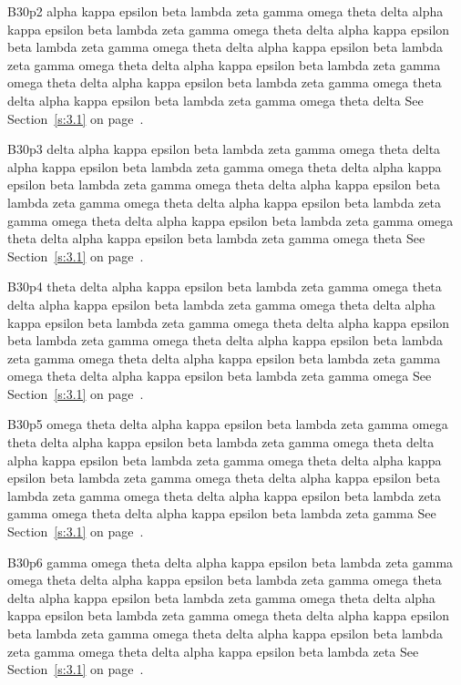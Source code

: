 B30p2 alpha kappa epsilon beta lambda zeta gamma omega theta delta alpha kappa epsilon beta lambda zeta gamma omega theta delta alpha kappa epsilon beta lambda zeta gamma omega theta delta alpha kappa epsilon beta lambda zeta gamma omega theta delta alpha kappa epsilon beta lambda zeta gamma omega theta delta alpha kappa epsilon beta lambda zeta gamma omega theta delta alpha kappa epsilon beta lambda zeta gamma omega theta delta See Section~\ref{s:3.1} on page~\pageref{s:3.1}.

B30p3 delta alpha kappa epsilon beta lambda zeta gamma omega theta delta alpha kappa epsilon beta lambda zeta gamma omega theta delta alpha kappa epsilon beta lambda zeta gamma omega theta delta alpha kappa epsilon beta lambda zeta gamma omega theta delta alpha kappa epsilon beta lambda zeta gamma omega theta delta alpha kappa epsilon beta lambda zeta gamma omega theta delta alpha kappa epsilon beta lambda zeta gamma omega theta See Section~\ref{s:3.1} on page~\pageref{s:3.1}.

B30p4 theta delta alpha kappa epsilon beta lambda zeta gamma omega theta delta alpha kappa epsilon beta lambda zeta gamma omega theta delta alpha kappa epsilon beta lambda zeta gamma omega theta delta alpha kappa epsilon beta lambda zeta gamma omega theta delta alpha kappa epsilon beta lambda zeta gamma omega theta delta alpha kappa epsilon beta lambda zeta gamma omega theta delta alpha kappa epsilon beta lambda zeta gamma omega See Section~\ref{s:3.1} on page~\pageref{s:3.1}.

B30p5 omega theta delta alpha kappa epsilon beta lambda zeta gamma omega theta delta alpha kappa epsilon beta lambda zeta gamma omega theta delta alpha kappa epsilon beta lambda zeta gamma omega theta delta alpha kappa epsilon beta lambda zeta gamma omega theta delta alpha kappa epsilon beta lambda zeta gamma omega theta delta alpha kappa epsilon beta lambda zeta gamma omega theta delta alpha kappa epsilon beta lambda zeta gamma See Section~\ref{s:3.1} on page~\pageref{s:3.1}.

B30p6 gamma omega theta delta alpha kappa epsilon beta lambda zeta gamma omega theta delta alpha kappa epsilon beta lambda zeta gamma omega theta delta alpha kappa epsilon beta lambda zeta gamma omega theta delta alpha kappa epsilon beta lambda zeta gamma omega theta delta alpha kappa epsilon beta lambda zeta gamma omega theta delta alpha kappa epsilon beta lambda zeta gamma omega theta delta alpha kappa epsilon beta lambda zeta See Section~\ref{s:3.1} on page~\pageref{s:3.1}.

